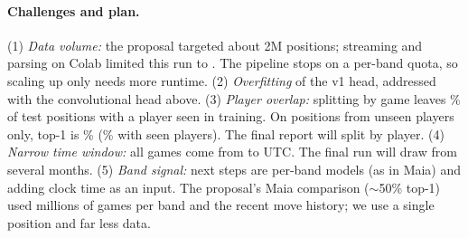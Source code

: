 \paragraph{Challenges and plan.}
(1) \emph{Data volume:} the proposal targeted about 2M positions; streaming and parsing on Colab limited
this run to \nTotal{}. The pipeline stops on a per-band quota, so scaling up only needs more runtime.
(2) \emph{Overfitting} of the v1 head, addressed with the convolutional head above.
(3) \emph{Player overlap:} splitting by game leaves \seenFrac\% of test positions with a player seen in
training. On positions from unseen players only, top-1 is \topOneUnseen\% (\topOneSeen\% with seen
players). The final report will split by player.
(4) \emph{Narrow time window:} all games come from \spanStart{} to \spanEnd{} UTC. The final run will draw
from several months.
(5) \emph{Band signal:} next steps are per-band models (as in Maia) and adding clock time as an input.
The proposal's Maia comparison ($\sim$50\% top-1) used millions of games per band and the recent move history; we
use a single position and far less data.
